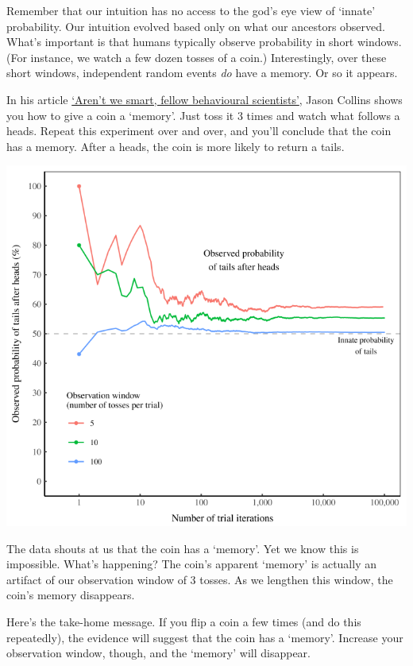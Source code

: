 \documentclass[
]{book}
\begin{document}
Remember that our intuition has no access to the god's eye view of `innate' probability. Our intuition evolved based only on what our ancestors observed. What's important is that humans typically observe probability in short windows. (For instance, we watch a few dozen tosses of a coin.) Interestingly, over these short windows, independent random events \emph{do} have a memory. Or so it appears.

In his article \href{https://jasoncollins.blog/arent-we-smart-fellow-behavioural-scientists/}{`Aren't we smart, fellow behavioural scientists'}, Jason Collins shows you how to give a coin a `memory'. Just toss it 3 times and watch what follows a heads. Repeat this experiment over and over, and you'll conclude that the coin has a memory. After a heads, the coin is more likely to return a tails.

\includegraphics{fig/tails_after_head_by_multi_tosses.png}

The data shouts at us that the coin has a `memory'. Yet we know this is impossible. What's happening?
The coin's apparent `memory' is actually an artifact of our observation window of 3 tosses. As we lengthen this window, the coin's memory disappears.

Here's the take-home message. If you flip a coin a few times (and do this repeatedly), the evidence will suggest that the coin has a `memory'. Increase your observation window, though, and the `memory' will disappear.
\end{document}
